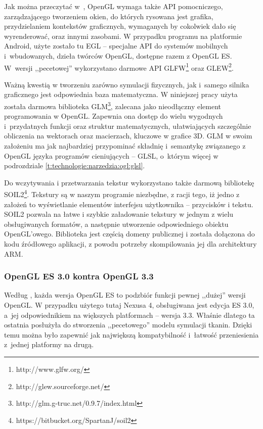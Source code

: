 		Jak można przeczytać w~\cite{oglspec}, OpenGL wymaga także API pomocniczego, zarządzającego tworzeniem okien, do których rysowana jest grafika, przydzielaniem kontekstów graficznych, wymaganych by cokolwiek dało się wyrenderować, oraz innymi zasobami. W przypadku programu na platformie Android, użyte zostało tu EGL -- specjalne API do systemów mobilnych i~wbudowanych, dzieła twórców OpenGL, dostępne razem z OpenGL ES. W~wersji ,,pecetowej'' wykorzystano darmowe API GLFW\footnote{http://www.glfw.org/} oraz GLEW\footnote{http://glew.sourceforge.net/}.
		
		Ważną kwestią w tworzeniu zarówno symulacji fizycznych, jak i~samego silnika graficznego jest odpowiednia baza matematyczna. W niniejszej pracy użyta została darmowa biblioteka GLM\footnote{http://glm.g-truc.net/0.9.7/index.html}, zalecana jako nieodłączny element programowania w OpenGL. Zapewnia ona dostęp do wielu wygodnych i~przydatnych funkcji oraz struktur matematycznych, ułatwiających szczególnie obliczenia na wektorach oraz macierzach, kluczowe w grafice 3D. GLM w swoim założeniu ma jak najbardziej przypominać składnię i~semantykę związanego z OpenGL języka programów cieniujących -- GLSL, o~którym więcej w podrozdziale \ref{t:technologie:narzedzia:ogl:glsl}.
		
		Do wczytywania i przetwarzania tekstur wykorzystano także darmową bibliotekę SOIL2\footnote{https://bitbucket.org/SpartanJ/soil2}. Tekstury są w naszym programie niezbędne, z racji tego, iż jedno z założeń to wyświetlanie elementów interfejsu użytkownika -- przycisków i tekstu. SOIL2 pozwala na łatwe i szybkie załadowanie tekstury w jednym z wielu obsługiwanych formatów, a następnie utworzenie odpowiedniego obiektu OpenGL'owego. Biblioteka jest częścią domeny publicznej i została dołączona do kodu źródłowego aplikacji, z powodu potrzeby skompilowania jej dla architektury ARM.
		
			\subsubsection{OpenGL ES 3.0 kontra OpenGL 3.3}
			\label{t:technologie:narzedzia:ogl:vs}
			
			Według \cite{oglspec}, każda wersja OpenGL ES to podzbiór funkcji pewnej ,,dużej'' wersji OpenGL. W przypadku użytego tutaj Nexusa 4, obsługiwana jest edycja ES 3.0, a~jej odpowiednikiem na większych platformach -- wersja 3.3. Właśnie dlatego ta ostatnia posłużyła do stworzenia ,,pecetowego'' modelu symulacji tkanin. Dzięki temu można było zapewnić jak największą kompatybilność i~łatwość przeniesienia z~jednej platformy na drugą.
			
